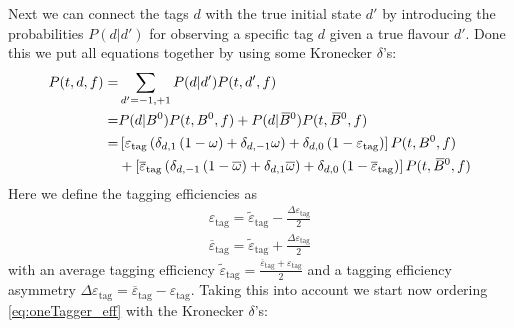 Next we can connect the tags $d$ with the true initial state $d'$ by introducing the probabilities $P(d|d')$ for observing a specific tag $d$ given a true
flavour $d'$. Done this we put all equations together by using some Kronecker $\delta$'s:
\begin{align}
P(t,d,f) =& \sum_{d'=-1,+1} P(d|d')P(t,d',f)\nonumber\\
=& P(d|B^0)P(t,B^0,f) + P(d|\kern 0.18em\overline{\kern -0.18em B}{}^0)P(t,\kern 0.18em\overline{\kern -0.18em B}{}^0,f)\nonumber\\
=&\left[\varepsilon_\text{tag}\left(\delta_{d,1}\left(1-\omega\right)+\delta_{d,-1}\omega\right)
  +\delta_{d,0}\left(1-\varepsilon_\text{tag}\right)\right]P(t,B^0,f)\nonumber\\
&+\left[\overline{\varepsilon}_\text{tag}\left(\delta_{d,-1}\left(1-\overline{\omega}\right)+\delta_{d,1}\overline{\omega}\right)
  +\delta_{d,0}\left(1-\overline{\varepsilon}_\text{tag}\right)\right]P(t,\kern 0.18em\overline{\kern -0.18em B}{}^0,f)\label{eq:oneTagger_eff}
\end{align}
Here we define the tagging efficiencies as
\begin{align*}
\varepsilon_\text{tag} = \tilde{\varepsilon}_\text{tag}-\frac{\Delta\varepsilon_\text{tag}}{2}\\
\overline{\varepsilon}_\text{tag} = \tilde{\varepsilon}_\text{tag}+\frac{\Delta\varepsilon_\text{tag}}{2}
\end{align*}
with an average tagging efficiency $\tilde{\varepsilon}_\text{tag}=\tfrac{\overline{\varepsilon}_\text{tag}+\varepsilon_\text{tag}}{2}$
and a tagging efficiency asymmetry $\Delta\varepsilon_\text{tag}=\overline{\varepsilon}_\text{tag}-\varepsilon_\text{tag}$.
Taking this into account we start now ordering \cref{eq:oneTagger_eff} with the Kronecker $\delta$'s:
